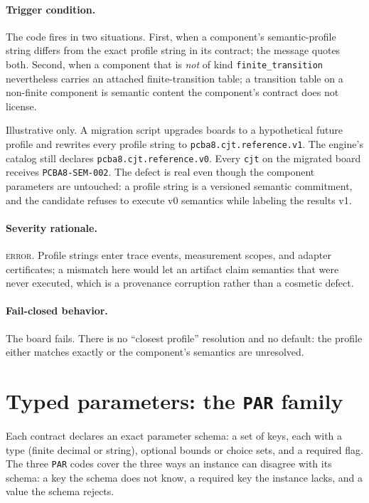 \paragraph{Trigger condition.} The code fires in two situations. First, when a component's semantic-profile string differs from the exact profile string in its contract; the message quotes both. Second, when a component that is \emph{not} of kind \texttt{finite\_transition} nevertheless carries an attached finite-transition table; a transition table on a non-finite component is semantic content the component's contract does not license.

\begin{example}\label{ch07:ex:sem002}
Illustrative only. A migration script upgrades boards to a hypothetical future profile and rewrites every profile string to \texttt{pcba8.cjt.reference.v1}. The engine's catalog still declares \texttt{pcba8.cjt.reference.v0}. Every \texttt{cjt} on the migrated board receives \texttt{PCBA8-SEM-002}. The defect is real even though the component parameters are untouched: a profile string is a versioned semantic commitment, and the candidate refuses to execute v0 semantics while labeling the results v1.
\end{example}

\paragraph{Severity rationale.} \textsc{error}. Profile strings enter trace events, measurement scopes, and adapter certificates; a mismatch here would let an artifact claim semantics that were never executed, which is a provenance corruption rather than a cosmetic defect.

\paragraph{Fail-closed behavior.} The board fails. There is no ``closest profile'' resolution and no default: the profile either matches exactly or the component's semantics are unresolved.

\section{Typed parameters: the \texttt{PAR} family}\label{ch07:sec:par}

Each contract declares an exact parameter schema: a set of keys, each with a type (finite decimal or string), optional bounds or choice sets, and a required flag. The three \texttt{PAR} codes cover the three ways an instance can disagree with its schema: a key the schema does not know, a required key the instance lacks, and a value the schema rejects.

